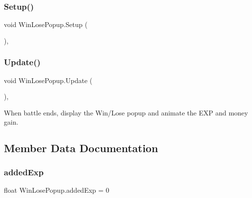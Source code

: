 \subsubsection{\texorpdfstring{Setup()}{Setup()}}
{\footnotesize\ttfamily void Win\+Lose\+Popup.\+Setup (\begin{DoxyParamCaption}{ }\end{DoxyParamCaption})\hspace{0.3cm}{\ttfamily [inline]}, {\ttfamily [private]}}

\mbox{\label{class_win_lose_popup_a9f1909bfd129a06cb0ff7048ccf19d0f}} 
\subsubsection{\texorpdfstring{Update()}{Update()}}
{\footnotesize\ttfamily void Win\+Lose\+Popup.\+Update (\begin{DoxyParamCaption}{ }\end{DoxyParamCaption})\hspace{0.3cm}{\ttfamily [inline]}, {\ttfamily [private]}}



When battle ends, display the Win/\+Lose popup and animate the E\+XP and money gain. 



\subsection{Member Data Documentation}
\mbox{\label{class_win_lose_popup_a24495c1926e8cf1d2284204629e8ce78}} 
\subsubsection{\texorpdfstring{addedExp}{addedExp}}
{\footnotesize\ttfamily float Win\+Lose\+Popup.\+added\+Exp = 0\hspace{0.3cm}{\ttfamily [private]}}

\mbox{\label{class_win_lose_popup_a5da1387cc4bb2efb52708a85b5a70685}} 
